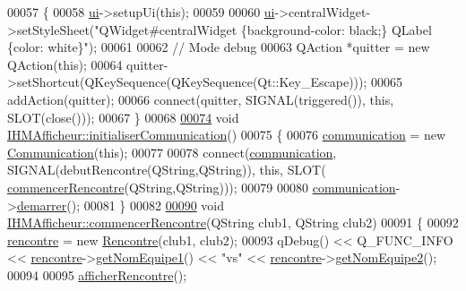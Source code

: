 \begin{DoxyCode}
00057 \{
00058     \hyperlink{class_i_h_m_afficheur_a26ca43f1ff87b1caa2191adcce444d23}{ui}->setupUi(\textcolor{keyword}{this});
00059 
00060     \hyperlink{class_i_h_m_afficheur_a26ca43f1ff87b1caa2191adcce444d23}{ui}->centralWidget->setStyleSheet(\textcolor{stringliteral}{"QWidget#centralWidget \{background-color: black;\} QLabel \{color:
       white\}"});
00061 
00062     \textcolor{comment}{// Mode debug}
00063     QAction *quitter = \textcolor{keyword}{new} QAction(\textcolor{keyword}{this});
00064     quitter->setShortcut(QKeySequence(QKeySequence(Qt::Key\_Escape)));
00065     addAction(quitter);
00066     connect(quitter, SIGNAL(triggered()), \textcolor{keyword}{this}, SLOT(close()));
00067 \}
00068 
\hyperlink{class_i_h_m_afficheur_ab7a8db8e7cfa6dc86ab59a07ede75298}{00074} \textcolor{keywordtype}{void} \hyperlink{class_i_h_m_afficheur_ab7a8db8e7cfa6dc86ab59a07ede75298}{IHMAfficheur::initialiserCommunication}()
00075 \{
00076     \hyperlink{class_i_h_m_afficheur_a331b5544e96cc908336a1486b52c379b}{communication} = \textcolor{keyword}{new} \hyperlink{class_communication}{Communication}(\textcolor{keyword}{this});
00077 
00078     connect(\hyperlink{class_i_h_m_afficheur_a331b5544e96cc908336a1486b52c379b}{communication}, SIGNAL(debutRencontre(QString,QString)), \textcolor{keyword}{this}, SLOT(
      \hyperlink{class_i_h_m_afficheur_ad2dc0742d9cdda731a16c570fd6f2434}{commencerRencontre}(QString,QString)));
00079 
00080     \hyperlink{class_i_h_m_afficheur_a331b5544e96cc908336a1486b52c379b}{communication}->\hyperlink{class_communication_af29ea9a1c2ce29436f2331c322f6ebbf}{demarrer}();
00081 \}
00082 
\hyperlink{class_i_h_m_afficheur_ad2dc0742d9cdda731a16c570fd6f2434}{00090} \textcolor{keywordtype}{void} \hyperlink{class_i_h_m_afficheur_ad2dc0742d9cdda731a16c570fd6f2434}{IHMAfficheur::commencerRencontre}(QString club1, QString club2)
00091 \{
00092     \hyperlink{class_i_h_m_afficheur_aef34d340f7ea30f049a98efc47bd9779}{rencontre} = \textcolor{keyword}{new} \hyperlink{class_rencontre}{Rencontre}(club1, club2);
00093     qDebug() << Q\_FUNC\_INFO << \hyperlink{class_i_h_m_afficheur_aef34d340f7ea30f049a98efc47bd9779}{rencontre}->\hyperlink{class_rencontre_a50df24caf57437d8eaaadae43ff846ec}{getNomEquipe1}() << \textcolor{stringliteral}{"vs"} << 
      \hyperlink{class_i_h_m_afficheur_aef34d340f7ea30f049a98efc47bd9779}{rencontre}->\hyperlink{class_rencontre_ac544f97755480e0e2718d0802d308585}{getNomEquipe2}();
00094 
00095     \hyperlink{class_i_h_m_afficheur_aec1fee14a130ea53206bf5f8e532b819}{afficherRencontre}();

\end{DoxyCode}
